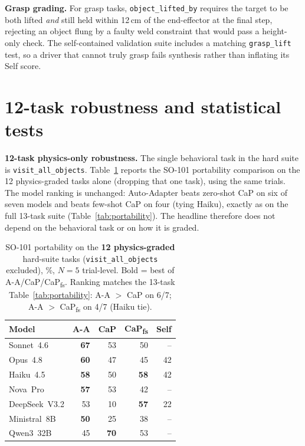 \noindent\textbf{Grasp grading.} For grasp tasks,
\texttt{object\_lifted\_by} requires the target to be both lifted
\emph{and} still held within 12\,cm of the end-effector at the final
step, rejecting an object flung by a faulty weld constraint that would
pass a height-only check. The self-contained validation suite includes
a matching \texttt{grasp\_lift} test, so a driver that cannot truly
grasp fails synthesis rather than inflating its Self score.

\section{12-task robustness and statistical tests}
\label{app:robustness}

\noindent\textbf{12-task physics-only robustness.} The single
behavioral task in the hard suite is \texttt{visit\_all\_objects}.
Table~\ref{tab:robustness} reports the SO-101 portability comparison
on the 12 physics-graded tasks alone (dropping that one task), using
the same trials. The model ranking is unchanged: Auto-Adapter beats
zero-shot CaP on six of seven models and beats few-shot CaP on four
(tying Haiku), exactly as on the full 13-task suite
(Table~\ref{tab:portability}). The headline therefore does not depend
on the behavioral task or on how it is graded.

\begin{table}[H]
\centering
\small
\begin{tabular}{lrrrr}
\toprule
\textbf{Model} & \textbf{A-A} & \textbf{CaP} & \textbf{CaP\textsubscript{fs}} & \textbf{Self} \\
\midrule
Sonnet~4.6    & \textbf{67} & 53 & 50 & -- \\
Opus~4.8      & \textbf{60} & 47 & 45 & 42 \\
Haiku~4.5     & \textbf{58} & 50 & \textbf{58} & 42 \\
Nova~Pro      & \textbf{57} & 53 & 42 & -- \\
DeepSeek~V3.2 & 53          & 10 & \textbf{57} & 22 \\
Ministral~8B  & \textbf{50} & 25 & 38 & -- \\
Qwen3~32B     & 45          & \textbf{70} & 53 & -- \\
\bottomrule
\end{tabular}
\caption{SO-101 portability on the \textbf{12 physics-graded} hard-suite
tasks (\texttt{visit\_all\_objects} excluded), \%, $N{=}5$ trial-level.
Bold = best of A-A/CaP/CaP\textsubscript{fs}. Ranking matches the
13-task Table~\ref{tab:portability}: A-A $>$ CaP on 6/7; A-A $>$
CaP\textsubscript{fs} on 4/7 (Haiku tie).}
\label{tab:robustness}
\end{table}

